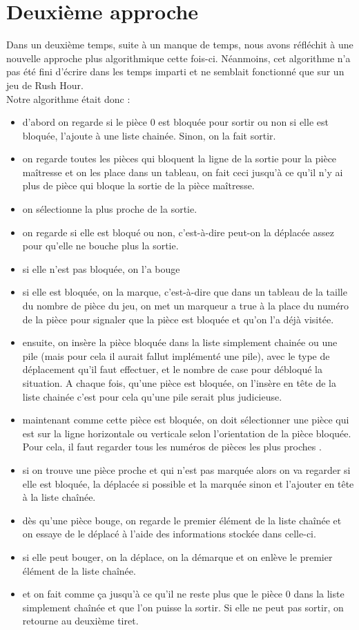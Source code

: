 \documentclass{report}
\begin{document}
\section{Deuxième approche}
Dans un deuxième temps, suite à un manque de temps, nous avons réfléchit à une nouvelle approche plus algorithmique cette fois-ci. Néanmoins, cet algorithme n'a pas été fini d'écrire dans les temps imparti et ne semblait fonctionné que sur un jeu de Rush Hour.\\
Notre algorithme était donc :
\begin{itemize}
\item d'abord on regarde si le pièce 0 est bloquée pour sortir ou  non si elle est bloquée, l'ajoute à une liste chainée. Sinon, on la fait sortir.
\item on regarde toutes les pièces qui bloquent la ligne de la sortie pour la pièce maîtresse et on les place dans un tableau, on fait ceci jusqu'à ce qu'il n'y ai plus de pièce qui bloque la sortie de la pièce maîtresse.
\item on sélectionne la plus proche de la sortie.
\item on regarde si elle est bloqué ou non, c'est-à-dire peut-on la déplacée assez pour qu'elle ne bouche plus la sortie.
\item si elle n'est pas bloquée, on l'a bouge
\item si elle est bloquée, on la marque, c'est-à-dire que dans un tableau de la taille du nombre de pièce du jeu, on met un marqueur a true à la place du numéro de la  pièce pour signaler que la pièce est bloquée et qu'on l'a déjà visitée.
\item ensuite, on insère la pièce bloquée dans la liste simplement chainée ou une pile (mais pour cela il aurait fallut implémenté une pile), avec le type de déplacement qu'il faut effectuer, et le nombre de case pour débloqué la situation. A chaque fois, qu'une pièce est bloquée, on l'insère en tête de la liste chainée c'est pour cela qu'une pile serait plus judicieuse.
\item maintenant comme cette pièce est bloquée, on doit sélectionner une pièce qui est sur la ligne horizontale ou verticale selon l'orientation de la pièce bloquée. Pour cela, il faut regarder tous les numéros de pièces les plus proches .
\item si on trouve une pièce proche et qui n'est pas marquée alors on va regarder si elle est bloquée, la déplacée si possible et la marquée sinon et l'ajouter en tête à la liste chaînée.
\item dès qu'une pièce bouge, on regarde le premier élément de la liste chaînée et on essaye de le déplacé à l'aide des informations stockée dans celle-ci.
\item si elle peut bouger, on la déplace, on la démarque et on enlève le premier élément de la liste chaînée.
\item et on fait comme ça jusqu'à ce qu'il ne reste plus que le pièce 0 dans la liste simplement chaînée et que l'on puisse la sortir. Si elle ne peut pas sortir, on retourne au deuxième tiret. 
\end{itemize}
\end{document}
